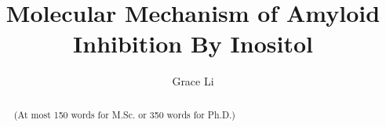 \documentclass[12pt,doublespaced,normalmargins]{ut-thesis}
\author{Grace Li}
\title{Molecular Mechanism of Amyloid Inhibition By Inositol}
\begin{document}
\begin{preliminary}


\cleardoublepage

\begin{abstract}
(At most 150 words for M.Sc. or 350 words for Ph.D.)

\end{abstract}


\begin{dedication}

\end{dedication}

\newpage

\begin{acknowledgements}

\end{acknowledgements}

\tableofcontents
\listoftables
\listoffigures

\printnomenclature
\end{preliminary}
\end{document}
